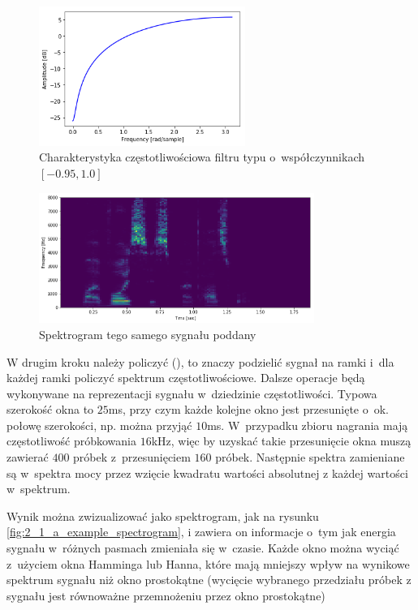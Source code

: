 \begin{figure}[H]
    \centering
    \includegraphics[width=0.6\textwidth]{images/2_1_c_preemphasis_response}
    \caption{Charakterystyka częstotliwościowa filtru typu  o~współczynnikach $[-0.95, 1.0]$}
    \label{fig:2_1_c_preemphasis_response}
\end{figure}

\begin{figure}[H]
    \centering
    \includegraphics[width=0.8\textwidth]{images/2_1_b_example_preemphasis}
    \caption{Spektrogram tego samego sygnału poddany }
    \label{fig:2_1_b_example_preemphasis}
\end{figure}

W drugim kroku należy policzyć  (), to znaczy podzielić
sygnał na ramki i~dla każdej ramki policzyć spektrum częstotliwościowe. Dalsze operacje
będą wykonywane na reprezentacji sygnału w~dziedzinie częstotliwości. Typowa szerokość
okna to $25$ms, przy czym każde kolejne okno jest przesunięte o~ok. połowę szerokości,
np. można przyjąć $10$ms. W~przypadku zbioru  nagrania mają częstotliwość próbkowania $16$kHz,
więc by uzyskać takie przesunięcie okna muszą zawierać $400$ próbek z~przesunięciem $160$ próbek.
Następnie spektra zamieniane są w~spektra mocy przez wzięcie kwadratu wartości absolutnej
z każdej wartości w~spektrum.

Wynik  można zwizualizować jako spektrogram, jak na rysunku \ref{fig:2_1_a_example_spectrogram},
i zawiera on informacje o~tym jak energia sygnału w~różnych pasmach zmieniała się w~czasie.
Każde okno można wyciąć z~użyciem okna Hamminga lub Hanna, które mają mniejszy wpływ
na wynikowe spektrum sygnału niż okno prostokątne (wycięcie wybranego przedziału próbek
z sygnału jest równoważne przemnożeniu przez okno prostokątne)

